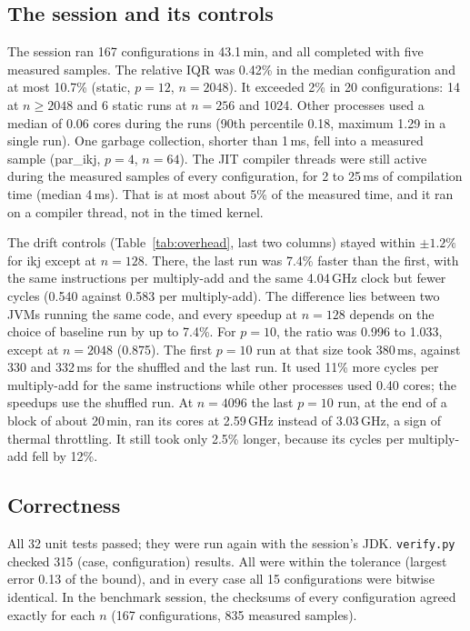\documentclass[11pt,a4paper]{article}
\begin{document}
\subsection{The session and its controls}
\label{sec:session}

The session ran 167 configurations in 43.1\,min, and all completed with five
measured samples. The relative IQR was 0.42\% in the median configuration and
at most 10.7\% (static, $p=12$, $n=2048$). It exceeded 2\% in 20
configurations: 14 at $n\ge2048$ and 6 static runs at $n=256$ and 1024. Other
processes used a median of 0.06 cores during the runs (90th percentile 0.18,
maximum 1.29 in a single run). One garbage collection, shorter than 1\,ms, fell
into a measured sample (par\_ikj, $p=4$, $n=64$). The JIT compiler threads were
still active during the measured samples of every configuration, for 2 to
25\,ms of compilation time (median 4\,ms). That is at most about 5\% of the
measured time, and it ran on a compiler thread, not in the timed kernel.

The drift controls (Table~\ref{tab:overhead}, last two columns) stayed within
$\pm1.2\%$ for ikj except at $n=128$. There, the last run was 7.4\% faster than
the first, with the same instructions per multiply-add and the same 4.04\,GHz
clock but fewer cycles (0.540 against 0.583 per multiply-add). The difference
lies between two JVMs running the same code, and every speedup at $n=128$
depends on the choice of baseline run by up to 7.4\%. For $p=10$, the ratio was
0.996 to 1.033, except at $n=2048$ (0.875). The first $p=10$ run at that size
took 380\,ms, against 330 and 332\,ms for the shuffled and the last run. It used
11\% more cycles per multiply-add for the same instructions while other
processes used 0.40 cores; the speedups use the shuffled run. At $n=4096$ the
last $p=10$ run, at the end of a block of about 20\,min, ran its cores at
2.59\,GHz instead of 3.03\,GHz, a sign of thermal throttling. It still took only
2.5\% longer, because its cycles per multiply-add fell by 12\%.

\subsection{Correctness}

All 32 unit tests passed; they were run again with the session's JDK.
\texttt{verify.py} checked 315 (case, configuration) results. All were within
the tolerance (largest error 0.13 of the bound), and in every case all 15
configurations were bitwise identical. In the benchmark session, the checksums
of every configuration agreed exactly for each $n$ (167 configurations, 835
measured samples).
\end{document}
